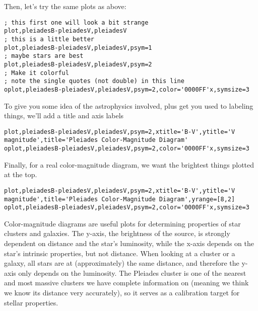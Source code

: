 \documentclass{article}
\begin{document}
\begin{spacing}{1.0}
Then, let's try the same plots as above:
\begin{lstlisting}
; this first one will look a bit strange
plot,pleiadesB-pleiadesV,pleiadesV
; this is a little better
plot,pleiadesB-pleiadesV,pleiadesV,psym=1
; maybe stars are best
plot,pleiadesB-pleiadesV,pleiadesV,psym=2
; Make it colorful
; note the single quotes (not double) in this line
oplot,pleiadesB-pleiadesV,pleiadesV,psym=2,color='0000FF'x,symsize=3
\end{lstlisting}

To give you some idea of the astrophysics involved, plus get you used to labeling things,
we'll add a title and axis labels

\begin{lstlisting}[breaklines]
plot,pleiadesB-pleiadesV,pleiadesV,psym=2,xtitle='B-V',ytitle='V magnitude',title='Pleiades Color-Magnitude Diagram'
oplot,pleiadesB-pleiadesV,pleiadesV,psym=2,color='0000FF'x,symsize=3
\end{lstlisting}

Finally, for a real color-magnitude diagram, we want the brightest things plotted at the top.
\begin{lstlisting}[breaklines,upquote=true]
plot,pleiadesB-pleiadesV,pleiadesV,psym=2,xtitle='B-V',ytitle='V magnitude',title='Pleiades Color-Magnitude Diagram',yrange=[8,2]
oplot,pleiadesB-pleiadesV,pleiadesV,psym=2,color='0000FF'x,symsize=3
\end{lstlisting}

Color-magnitude diagrams are useful plots for determining properties of star
clusters and galaxies.  The y-axis, the brightness of the source, is strongly
dependent on distance and the star's luminosity, while the x-axis depends on
the star's intrinsic properties, but not distance.  When looking at a cluster
or a galaxy, all stars are at (approximately) the same distance, and therefore
the y-axis only depends on the luminosity.  The Pleiades cluster is one of the
nearest and most massive clusters we have complete information on (meaning we
think we know its distance very accurately), so it serves as a calibration
target for stellar properties.

\end{spacing}
\end{document}
